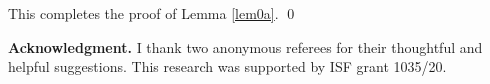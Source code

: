 \documentclass[11pt]{amsart}
\theoremstyle{plain}
\newcommand{\noi}{\noindent}
\begin{document}
This completes the proof of Lemma \ref{lem0a}.
\qed

\vspace{1em}

\noi
{\bf Acknowledgment.}
I thank two anonymous referees for their thoughtful and helpful suggestions.
This research was supported by ISF grant 1035/20.




\end{document}
